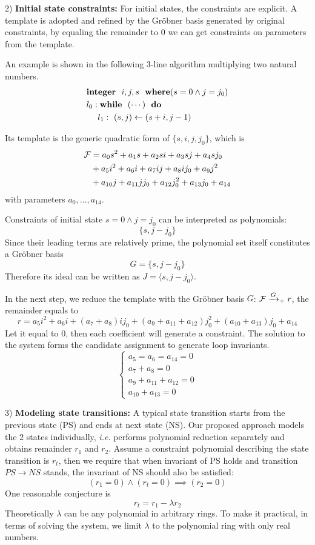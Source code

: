 2) {\bf Initial state constraints:} For initial states, the constraints are explicit. 
A template is adopted and refined by the Gr\"obner basis 
generated by original constraints, by equaling the remainder to 0 we can get constraints on
parameters from the template.

An example is shown in the following 3-line algorithm multiplying two natural numbers. 
\begin{align}
\label{eqn:loopinv}
& {\bf integer}~~i,j,s~~{\bf where}(s=0 \land j=j_0) \nonumber\\
& l_0: {\bf while}~~(\cdots)~~{\bf do} \nonumber\\
& ~~~~ l_1:~(s,j)\gets(s+i,j-1) 
\end{align}

Its template is the generic quadratic form of $\{s,i,j,j_0\}$, which is
\begin{align}
{\mathcal{F}} &= a_0s^2+a_1s+a_2si+a_3sj+a_4sj_0\nonumber\\
&+a_5i^2+a_6i+a_7ij+a_8ij_0+a_9j^2\nonumber\\
&+a_{10}j+a_{11}jj_0+a_{12}j_0^2+a_{13}j_0+a_{14}\nonumber
\end{align}
with parameters $a_0,\dots,a_{14}$.

Constraints of initial state $s=0\land j=j_0$ can be interpreted as polynomials:
$$\{s, j-j_0\}$$
Since their leading terms are relatively prime, the polynomial set itself constitutes a Gr\"obner basis 
$$G=\{s, j-j_0\}$$ 
Therefore its ideal can be written as
$J=\langle s,j-j_0\rangle$.

In the next step, we reduce the template with the Gr\"obner basis $G$: ${\mathcal{F}} \xrightarrow{G}_+ r$, the remainder equals to
$$r = a_5i^2+a_6i+(a_7+a_8)ij_0+(a_9+a_{11}+a_{12})j_0^2+(a_{10}+a_{13})j_0+a_{14}$$
Let it equal to 0, then each coefficient will generate a constraint. The solution to the system forms the candidate
assignment to generate loop invariants.
\begin{equation}
\label{eqn:parasys}
\left\{
\begin{array}{l}
a_5=a_6=a_{14}=0\\
a_7+a_8=0\\
a_9+a_{11}+a_{12}=0\\
a_{10}+a_{13}=0
\end{array}\right.
\end{equation}

3) {\bf Modeling state transitions:}
A typical state transition starts from the previous state (PS) and ends at next state (NS). 
Our proposed approach models the 2 states individually,
{\it i.e.} performs polynomial reduction separately and obtains remainder $r_1$ and $r_2$. 
Assume a constraint polynomial describing
the state transition is $r_t$, then we require that when invariant of PS holds and transition $PS \to NS$ stands,
the invariant of NS should also be satisfied:
$$(r_1 = 0)\land (r_t = 0) \implies (r_2 = 0)$$
One reasonable conjecture is
$$r_t = r_1 - \lambda r_2$$
Theoretically $\lambda$ can be any polynomial in arbitrary rings. To make it practical, in terms of solving the system, 
we limit $\lambda$ to the polynomial ring with only real numbers.

